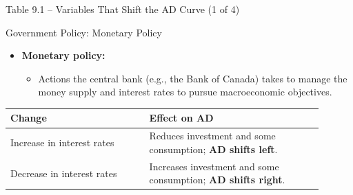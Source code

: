 \documentclass[aspectratio=169]{beamer}
\begin{document}
\begin{frame}{Table 9.1 -- Variables That Shift the AD Curve (1 of 4)}
\transfade
\begin{block}{Government Policy: Monetary Policy}
\end{block}
\begin{itemize}[<+->]
  \item \textbf{Monetary policy:}
  \begin{itemize}[<+->]
    \item Actions the central bank (e.g., the Bank of Canada) takes to manage the money supply and interest rates to pursue macroeconomic objectives.
  \end{itemize}
\end{itemize}
\begin{table}[h]
\centering
\begin{tabular}{p{0.4\linewidth} p{0.5\linewidth}}
\toprule
\textbf{Change} & \textbf{Effect on AD} \\
\midrule
Increase in interest rates & Reduces investment and some consumption; \textbf{AD shifts left}. \\
Decrease in interest rates & Increases investment and some consumption; \textbf{AD shifts right}. \\
\bottomrule
\end{tabular}
\end{table}
\end{frame}
\end{document}
